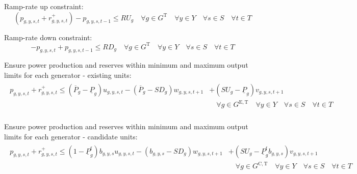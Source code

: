 \documentclass{article}
\newcommand{\sGeneratorsExistingThermal}{G^{\mathrm{E,T}}}
\newcommand{\sGeneratorsCandidateThermal}{G^{\mathrm{C,T}}}
\newcommand{\sGeneratorsThermal}{G^{\mathrm{T}}}
\newcommand{\sYears}{Y}
\newcommand{\sScenarios}{S}
\newcommand{\sIntervals}{T}
\newcommand{\iGenerator}{g}
\newcommand{\iYear}{y}
\newcommand{\iScenario}{s}
\newcommand{\iInterval}{t}
\newcommand{\cPowerOutputMax}[1][\iGenerator,\iYear]{\overline{P}_{#1}}
\newcommand{\cRampRateUp}[1][\iGenerator]{RU_{#1}}
\newcommand{\cRampRateDown}[1][\iGenerator]{RD_{#1}}
\newcommand{\cPowerOutputMin}[1][\iGenerator]{\underline{P}_{#1}}
\newcommand{\cPowerOutputMinProportion}{\cPowerOutputMin^{\mathrm{f}}}
\newcommand{\cRampRateStartup}[1][\iGenerator]{SU_{#1}}
\newcommand{\cRampRateShutdown}[1][\iGenerator]{SD_{#1}}
\newcommand{\vStartupIndicator}[1][\iGenerator,\iYear,\iScenario,\iInterval]{v_{#1}}
\newcommand{\vShutdownIndicator}[1][\iGenerator,\iYear,\iScenario,\iInterval]{w_{#1}}
\newcommand{\vReserveUp}[1][\iGenerator,\iYear,\iScenario,\iInterval]{r^{+}_{#1}}
\newcommand{\vOnIndicator}[1][\iGenerator,\iYear,\iScenario,\iInterval]{u_{#1}}
\newcommand{\vPower}[1][\iGenerator,\iYear,\iScenario,\iInterval]{p_{#1}}
\newcommand{\vInstalledCapacityTotalScenario}[1][\iGenerator,\iYear,\iScenario]{b_{#1}}
\begin{document}
Ramp-rate up constraint:
\begin{equation}
\left(\vPower + \vReserveUp\right) - \vPower[\iGenerator,\iYear,\iScenario,\iInterval-1] \leq \cRampRateUp \quad \forall \iGenerator \in \sGeneratorsThermal \quad \forall \iYear \in \sYears \quad \forall \iScenario \in \sScenarios \quad \forall \iInterval \in \sIntervals
\end{equation}

Ramp-rate down constraint:
\begin{equation}
- \vPower + \vPower[\iGenerator,\iYear,\iScenario,\iInterval-1] \leq \cRampRateDown \quad \forall \iGenerator \in \sGeneratorsThermal \quad \forall \iYear \in \sYears \quad \forall \iScenario \in \sScenarios \quad \forall \iInterval \in \sIntervals
\end{equation}

Ensure power production and reserves within minimum and maximum output limits for each generator - existing units:
\begin{align}
	\begin{split}
	\vPower + \vReserveUp \leq \left(\cPowerOutputMax[\iGenerator] - \cPowerOutputMin\right) \vOnIndicator - \left(\cPowerOutputMax[\iGenerator] -\cRampRateShutdown \right) \vShutdownIndicator[\iGenerator,\iYear,\iScenario,\iInterval+1] & + \left(\cRampRateStartup - \cPowerOutputMin\right)\vStartupIndicator[\iGenerator,\iYear,\iScenario,\iInterval+1]\\
	& \quad \forall \iGenerator \in \sGeneratorsExistingThermal \quad \forall \iYear \in \sYears \quad \forall \iScenario \in \sScenarios \quad \forall \iInterval \in \sIntervals\\
	\end{split}
\end{align}

Ensure power production and reserves within minimum and maximum output limits for each generator - candidate units:
\begin{align}
	\begin{split}
		\vPower + \vReserveUp \leq \left(1 - \cPowerOutputMinProportion\right) \vInstalledCapacityTotalScenario \vOnIndicator - \left(\vInstalledCapacityTotalScenario -\cRampRateShutdown \right) \vShutdownIndicator[\iGenerator,\iYear,\iScenario,\iInterval+1] & + \left(\cRampRateStartup - \cPowerOutputMinProportion\vInstalledCapacityTotalScenario \right)\vStartupIndicator[\iGenerator,\iYear,\iScenario,\iInterval+1]\\
		& \quad \forall \iGenerator \in \sGeneratorsCandidateThermal \quad \forall \iYear \in \sYears \quad \forall \iScenario \in \sScenarios \quad \forall \iInterval \in \sIntervals\\
		\label{eqn: power output within limits - candidate}
	\end{split}
\end{align}
\end{document}
